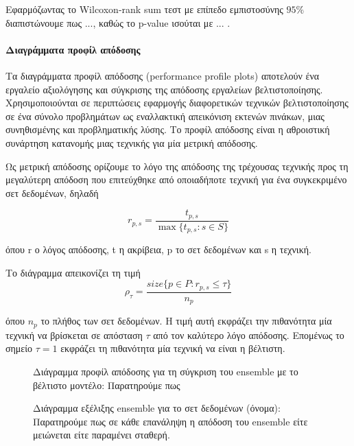 Εφαρμόζωντας το Wilcoxon-rank sum τεστ με επίπεδο εμπιστοσύνης $95\%$ διαπιστώνουμε πως ..., καθώς το p-value ισούται με ... .

\paragraph{Διαγράμματα προφίλ απόδοσης} 	Τα διαγράμματα προφίλ απόδοσης (performance profile plots) \citep{Dolan2002} αποτελούν ένα εργαλείο αξιολόγησης και σύγκρισης της απόδοσης εργαλείων βελτιστοποίησης. Χρησιμοποιούνται σε περιπτώσεις εφαρμογής διαφορετικών τεχνικών βελτιστοποίησης σε ένα σύνολο προβλημάτων ως εναλλακτική απεικόνιση εκτενών πινάκων, μιας συνηθισμένης και προβληματικής λύσης. Το προφίλ απόδοσης είναι η αθροιστική συνάρτηση κατανομής μιας τεχνικής για μία μετρική απόδοσης.

Ως μετρική απόδοσης ορίζουμε το λόγο της απόδοσης της τρέχουσας τεχνικής προς τη μεγαλύτερη απόδοση που επιτεύχθηκε από οποιαδήποτε τεχνική για ένα συγκεκριμένο σετ δεδομένων, δηλαδή

\begin{equation}
r_{p,s}= \frac{t_{p,s}}{\max\{{t_{p,s} : s \in S}\}}    
\end{equation} 

όπου r ο λόγος απόδοσης, t η ακρίβεια, p το σετ δεδομένων και s η τεχνική.

Το διάγραμμα απεικονίζει τη τιμή
\begin{equation}
\rho_{\tau}= \frac{size\{{p \in P : r_{p,s} \leq \tau  }\}}{n_p}   
\end{equation}

όπου $n_p$ το πλήθος των σετ δεδομένων. Η τιμή αυτή εκφράζει την πιθανότητα μία τεχνική να βρίσκεται σε απόσταση $\tau$ από τον καλύτερο λόγο απόδοσης.  Επομένως το σημείο $\tau = 1$ εκφράζει τη πιθανότητα μία τεχνική να είναι η βέλτιστη.


\begin{figure}[!htb]
	\begin{center}
		\caption[Διάγραμμα προφίλ απόδοσης για τη σύγκριση του ensemble με το βέλτιστο μοντέλο]{Διάγραμμα προφίλ απόδοσης για τη σύγκριση του ensemble με το βέλτιστο μοντέλο: Παρατηρούμε πως }
	\end{center}
\end{figure}

\begin{figure}[!htb]
	\begin{center}
		\caption[Διάγραμμα εξέλιξης ensemble για το σετ δεδομένων (όνομα)]{Διάγραμμα εξέλιξης ensemble για το σετ δεδομένων (όνομα): Παρατηρούμε πως σε κάθε επανάληψη η απόδοση του ensemble είτε μειώνεται είτε παραμένει σταθερή. }
	\end{center}
\end{figure} 	

